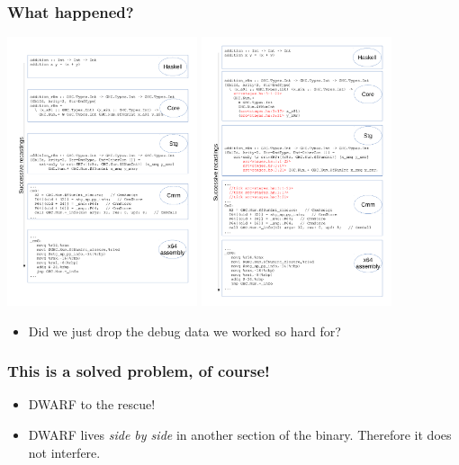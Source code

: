 \documentclass[11pt]{beamer} %
\begin{document}
  \begin{frame}
   \frametitle{What happened?}
   \includegraphics[trim=0 0.5in 0 7.8in, clip=true, width=2.2in]{fig/recastings}
   \includegraphics[trim=0 0 0 8.5in, clip=true, width=2.2in]{fig/recastings_ticks}
  \begin{itemize}
   \item Did we just drop the debug data we worked so hard for?
  \end{itemize}
  \end{frame}

  \begin{frame}
   \frametitle{This is a solved problem, of course!}
  \begin{itemize}
   \item <1-> DWARF to the rescue!
    \dwarfCode
   \item <2-> DWARF lives \emph{side by side} in another section of the binary.
     Therefore it does not interfere.
  \end{itemize}
  \end{frame}
\end{document}
